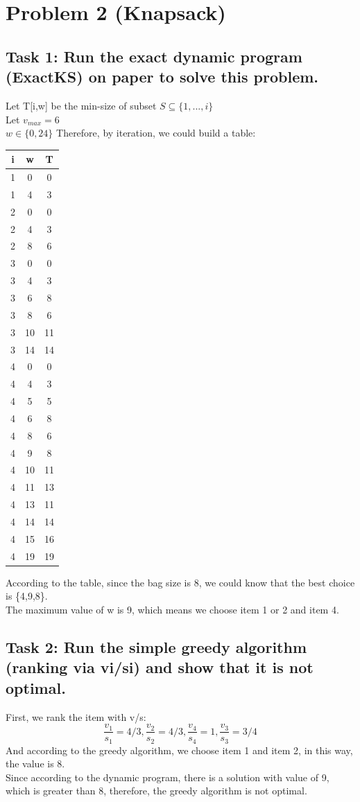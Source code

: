 \documentclass[a4paper,12pt]{journal}
\begin{document}
	\section*{Problem 2 (Knapsack)}
	\subsection*{Task 1: Run the exact dynamic program (ExactKS) on paper to solve this problem.}
	Let T[i,w] be the min-size of  subset $S\subseteq\{1,...,i\}$\\
	Let $v_{max}=6$\\
	$w\in\{0,24\}$
	Therefore, by iteration, we could build a table:
	\begin{center}
		\begin{tabular}{c c c}
			i&w&T\\\hline
			1&0&0\\
			1&4&3\\
			2&0&0\\
			2&4&3\\
			2&8&6\\
			3&0&0\\
			3&4&3\\
			3&6&8\\
			3&8&6\\
			3&10&11\\
			3&14&14\\
			4&0&0\\
			4&4&3\\
			4&5&5\\
			4&6&8\\
			4&8&6\\
			4&9&8\\
			4&10&11\\
			4&11&13\\
			4&13&11\\
			4&14&14\\
			4&15&16\\
			4&19&19\\
		\end{tabular}
	\end{center}
	According to the table, since the bag size is 8, we could know that the best choice is \{4,9,8\}.\\
	The maximum value of w is 9, which means we choose item 1 or 2 and item 4.
	\subsection*{Task 2: Run the simple greedy algorithm (ranking via vi/si) and show that it is not optimal.}
	First, we rank the item with v/s:
	$$\frac{v_1}{s_1}=4/3,\frac{v_2}{s_2}=4/3,\frac{v_4}{s_4}=1,\frac{v_3}{s_3}=3/4$$
	And according to the greedy algorithm, we choose item 1 and item 2, in this way, the value is 8.\\
	Since according to the dynamic program, there is a solution with value of 9, which is greater than 8, therefore, the greedy algorithm is not optimal.
\end{document}
